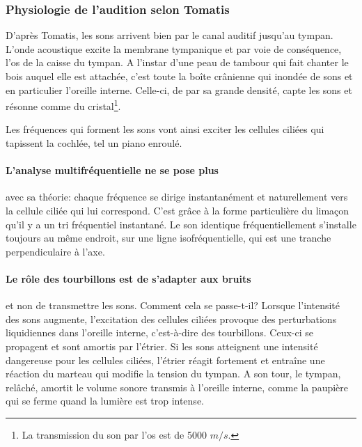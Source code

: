 \subsubsection{Physiologie de l'audition selon Tomatis}

D'après Tomatis, les sons arrivent bien par le canal auditif
jusqu'au tympan. L'onde acoustique excite la membrane tympanique et
par voie de conséquence, l'os de la caisse du tympan. 
A l'instar d'une
peau de tambour qui fait chanter le bois auquel elle est attachée,
c'est toute la boîte crânienne qui inondée de sons et en particulier
l'oreille interne. Celle-ci, de par sa grande densité, capte les sons
et résonne comme du cristal\footnote{La transmission du son par l'os est de 5000 $m/s$.}.

Les fréquences qui forment les sons vont ainsi exciter les cellules
ciliées qui tapissent la cochlée, tel un piano enroulé.

\paragraph{L'analyse multifréquentielle ne se pose plus}  
avec sa théorie: chaque fréquence se dirige instantanément et
 naturellement vers la cellule ciliée qui lui correspond. 
C'est grâce à la forme particulière du limaçon qu'il y a un tri fréquentiel instantané.
Le son identique fréquentiellement s'installe toujours au même endroit, sur une ligne isofréquentielle, qui est une tranche perpendiculaire à l'axe.


\paragraph{Le rôle des tourbillons est de s'adapter aux bruits}
et non de transmettre les sons.
Comment cela se passe-t-il? Lorsque l'intensité des sons aug\-men\-te,
l'ex\-ci\-ta\-tion des cellules ciliées provoque des perturbations liquidiennes
dans l'oreille interne, c'est-à-dire des tourbillons. Ceux-ci se propagent
et sont amortis par l'étrier. Si les sons atteignent une intensité
dangereuse pour les cellules ciliées, l'étrier réagit fortement et
entraîne une réaction du marteau qui modifie la tension du tympan.
A son tour, le tympan, relâché, amortit le volume sonore transmis
à l'oreille interne, comme la paupière qui se ferme quand la lumière
est trop intense.


